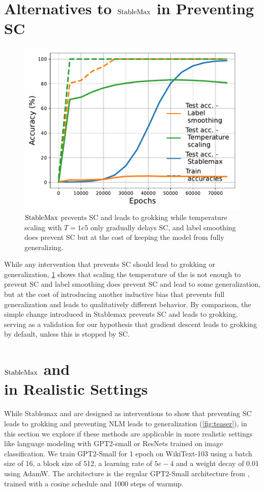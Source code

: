 \section{Alternatives to $\mathrm{StableMax}$ in Preventing SC}
\begin{figure}
    \vspace{-7mm}
    \includegraphics[width=\linewidth]{grokking_iclr_arxiv/figures/label_smoothing.pdf}
    \vspace{-8mm}
    \caption{$\mathrm{StableMax}$ prevents SC and leads to grokking while temperature scaling with $T=1e5$ only gradually delays SC, and label smoothing does prevent SC but at the cost of keeping the model from fully generalizing.}
    \label{fig:label_smoothing}
\end{figure}
While any intervention that prevents SC should lead to grokking or generalization, \cref{fig:label_smoothing} shows that scaling the temperature of the \softmax is not enough to prevent SC and label smoothing does prevent SC and lead to some generalization, but at the cost of introducing another inductive bias that prevents full generalization and leads to qualitatively different behavior. By comparison, the simple change introduced in Stablemax prevents SC and leads to grokking, serving as a validation for our hypothesis that gradient descent leads to grokking by default, unless this is stopped by SC.



\section{$\mathrm{StableMax}$ and \ograd \\ in Realistic Settings}
While Stablemax and \ograd are designed as interventions to show that preventing SC leads to grokking and preventing NLM leads to generalization (\cref{fig:teaser}), in this section we explore if these methods are applicable in more realistic settings like language modeling with GPT2-small or ResNets trained on image classification. We train GPT2-Small for 1 epoch on WikiText-103 using a batch size of 16, a block size of 512, a learning rate of $5e-4$ and a weight decay of 0.01 using AdamW. The architecture is the regular GPT2-Small architecture from \cite{radford2019language}, trained with a cosine schedule and 1000 steps of warmup.

